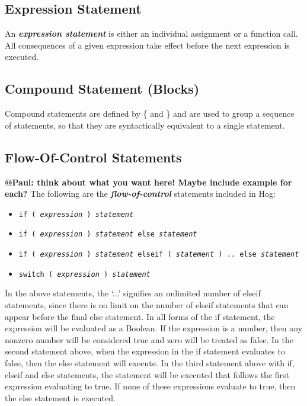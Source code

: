 \documentclass{article}
\begin{document}
\subsection{Expression Statement} %
\label{sub:expression_statement}

An \textbf{\emph{expression statement}} is either an individual assignment or a function call. All consequences of a given
expression take effect before the next expression is executed.


\subsection{Compound Statement (Blocks)} %
\label{sub:compound_statement}

Compound statements are defined by \{ and \} and are used to group a sequence of
statements, so that they are syntactically equivalent to a single statement.


\subsection{Flow-Of-Control Statements} %
\label{sub:flow_of_control_statements}

\textbf{@Paul: think about what you want here! Maybe include example for each?} The
following are the \textbf{\emph{flow-of-control}} statements included in Hog:

\begin{itemize}
  \item[] \tt if ( \rm \emph{expression} \tt ) \rm \emph{statement}
  \item[] \tt if ( \rm \emph{expression} \tt ) \rm \emph{statement} \tt else \rm \emph{statement}
  \item[] \tt if ( \rm \emph{expression} \tt ) \rm \emph{statement} \tt elseif ( \rm \emph{statement} \tt ) .. else 
  \rm \emph{statement}
  \item[] \tt switch ( \rm \emph{expression} \tt ) \rm \emph{statement} \rm
\end{itemize}

In the above statements, the ‘...’ signifies an unlimited number of elseif
statements, since there is no limit on the number of elseif statements that can
appear before the final else statement. In all forms of the if statement, the
expression will be evaluated as a Boolean. If the expression is a number, then any
non­zero number will be considered true and zero will be treated as false. In the
second statement above, when the expression in the if statement evaluates to false,
then the else statement will execute. In the third statement above with if, elseif
and else statements, the statement will be executed that follows the first
expression evaluating to true. If none of these expressions evaluate to true, then
the else statement is executed.
\end{document}
